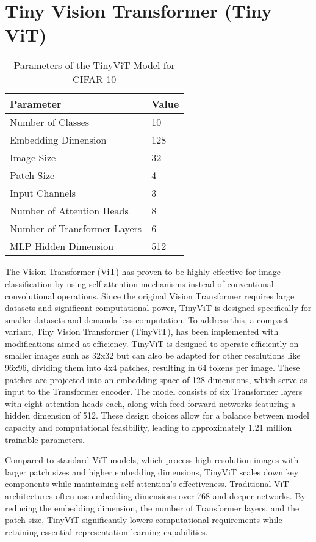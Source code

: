 \section{Tiny Vision Transformer (Tiny ViT)}

\begin{table}[htbp]
  \small
  \centering
  \caption{Parameters of the TinyViT Model for CIFAR-10}
  \begin{tabular}{@{}ll@{}}
    \toprule
    \textbf{Parameter} & \textbf{Value} \\
    \midrule
    Number of Classes & 10 \\
    Embedding Dimension & 128 \\
    Image Size & 32 \\
    Patch Size & 4 \\
    Input Channels & 3 \\
    Number of Attention Heads & 8 \\
    Number of Transformer Layers & 6 \\
    MLP Hidden Dimension & 512 \\
    \bottomrule
  \end{tabular}
\end{table}

The Vision Transformer (ViT) has proven to be highly effective for image classification by using self attention mechanisms instead of conventional convolutional operations. Since the original Vision Transformer requires large datasets and significant computational power, TinyViT is designed specifically for smaller datasets and demands less computation. To address this, a compact variant, Tiny Vision Transformer (TinyViT), has been implemented with modifications aimed at efficiency. TinyViT is designed to operate efficiently on smaller images such as 32x32 but can also be adapted for other resolutions like 96x96, dividing them into 4x4 patches, resulting in 64 tokens per image. These patches are projected into an embedding space of 128 dimensions, which serve as input to the Transformer encoder. The model consists of six Transformer layers with eight attention heads each, along with feed-forward networks featuring a hidden dimension of 512. These design choices allow for a balance between model capacity and computational feasibility, leading to approximately 1.21 million trainable parameters.

Compared to standard ViT models, which process high resolution images with larger patch sizes and higher embedding dimensions, TinyViT scales down key components while maintaining self attention’s effectiveness. Traditional ViT architectures often use embedding dimensions over 768 and deeper networks. By reducing the embedding dimension, the number of Transformer layers, and the patch size, TinyViT significantly lowers computational requirements while retaining essential representation learning capabilities.

